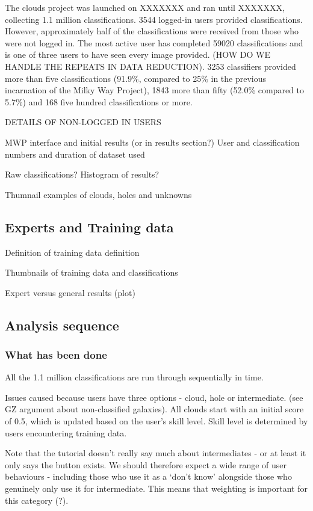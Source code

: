 \documentclass[a4,useAMS,usenatbib]{mn2e}
\begin{document}
The clouds project was launched on XXXXXXX and ran until XXXXXXX, collecting 1.1 million classifications. 3544 logged-in users provided classifications. However, approximately half of the classifications were received from those who were not logged in. The most active user has completed 59020 classifications and is one of three users to have seen every image provided. (HOW DO WE HANDLE THE REPEATS IN DATA REDUCTION). 3253 classifiers provided more than five classifications (91.9\%, compared to 25\% in the previous incarnation of the Milky Way Project), 1843 more than fifty (52.0\% compared to 5.7\%) and 168 five hundred classifications or more. 

DETAILS OF NON-LOGGED IN USERS


MWP interface and initial results (or in results section?)
User and classification numbers and duration of dataset used

Raw classifications?
Histogram of results?

Thumnail examples of clouds, holes and unknowns

\subsection{Experts and Training data}
Definition of training data definition

Thumbnails of training data and classifications

Expert versus general results (plot)

\subsection{Analysis sequence}

\subsubsection{What has been done}

All the 1.1 million classifications are run through sequentially in time.

Issues caused because users have three options - cloud, hole or intermediate. (see GZ argument about non-classified galaxies). All clouds start with an initial score of 0.5, which is updated based on the user's skill level. Skill level is determined by users encountering training data. 

Note that the tutorial doesn't really say much about intermediates - or at least it only says the button exists. We should therefore expect a wide range of user behaviours - including those who use it as a `don't know' alongside those who genuinely only use it for intermediate. This means that weighting is important for this category (?). 
\end{document}
